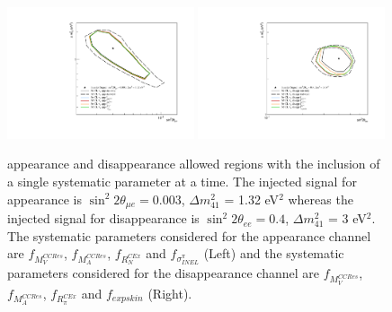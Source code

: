 \begin{figure}[h!]
    \centering
    \includegraphics[width = 0.49\textwidth]{figures-chap6/allowed_regions/single_param/nue_app.pdf}
    \includegraphics[width =0.49\textwidth]{figures-chap6/allowed_regions/single_param/nue_disapp.pdf}
    \caption[\nue appearance and disappearance allowed regions with the inclusion of a single systematic parameter at a time.]{\nue appearance and disappearance allowed regions with the inclusion of a single systematic parameter at a time. The injected signal for \nue appearance is $\sin^2{2\theta_{\mu e}} = 0.003$, $\Delta m^2_{41}$ = 1.32 eV$^2$ whereas the injected signal for \nue disappearance is $\sin^2{2\theta_{ee}} = 0.4$, $\Delta m^2_{41}$ = 3 eV$^2$. The systematic parameters considered for the \nue appearance channel are $f_{M_V^{CCRes}}$, $f_{M_A^{CCRes}}$, $f_{R_N^{C Ex}}$ and $f_{\sigma^{\pi}_{INEL}}$ (Left) and the systematic parameters considered for the \nue disappearance channel are $f_{M_V^{CCRes}}$, $f_{M_A^{CCRes}}$, $f_{R_{\pi}^{C Ex}}$ and $f_{expskin}$ (Right).}
    \label{fig:nue_injected_single_param}
\end{figure}

